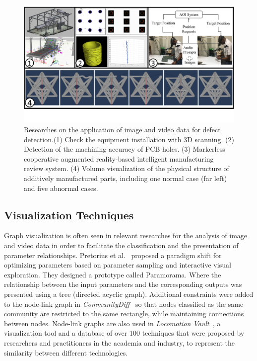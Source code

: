 \documentclass[a4paper,fleqn]{cas-dc}
\begin{document}
\begin{figure}
	\centering
	\includegraphics[width=\textwidth]{Images/imageandvideo.png}
	\vspace{-4em}
	\caption{Researches on the application of image and video data for defect detection.(1) Check the equipment installation with 3D scanning. (2) Detection of the machining accuracy of PCB holes. (3) Markerless cooperative augmented reality-based intelligent manufacturing review system. (4) Volume visualization of the physical structure of additively manufactured parts, including one normal case (far left) and five abnormal cases.}
	\label{fig:imageandvideo}
	\vspace{-2em}
\end{figure}

\subsection{Visualization Techniques}
Graph visualization is often seen in relevant researches for the analysis of image and video data in order to facilitate the classification and the presentation of parameter relationships.
Pretorius et al.~\cite{Pretorius2011} proposed a paradigm shift for optimizing parameters based on parameter sampling and interactive visual exploration. They designed a prototype called Paramorama. Where the relationship between the input parameters and the corresponding outputs was presented using a tree (directed acyclic graph).
Additional constraints were added to the node-link graph in \textit{CommunityDiff}~\cite{Emelyanova} so that nodes classified as the same community are restricted to the same rectangle, while maintaining connections between nodes.
Node-link graphs are also used in \textit{Locomotion Vault}~\cite{Luca2021}, a visualization tool and a database of over 100 techniques that were proposed by researchers and practitioners in the academia and industry, to represent the similarity between different technologies.
\end{document}

